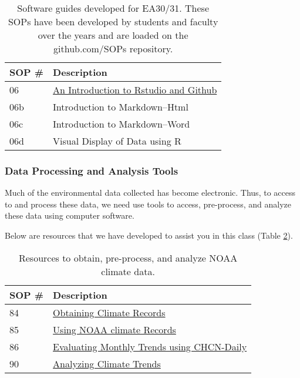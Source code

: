 \documentclass{article}\usepackage[]{graphicx}\usepackage[]{color}
\begin{document}
\begin{table}[h]
\caption{Software guides developed for EA30/31. These SOPs have been developed by students and faculty over the years and are loaded on the github.com/SOPs repository.}\label{tab:softwareguides}
\centering
\begin{tabular}{ll}\hline
SOP \#    & Description                                 \\\hline\hline
06        & \href{https://github.com/marclos/Climate_Change_Narratives/blob/master/Analysis_SOPs/SOP06_Rstudio_Server_Github.pdf}{An Introduction to Rstudio and Github} \\
06b       & Introduction to Markdown--Html  \\
06c       & Introduction to Markdown--Word  \\
06d       & Visual Display of Data using R  \\
\hline
\end{tabular}
\end{table}

\subsubsection{Data Processing and Analysis Tools}

Much of the environmental data collected has become electronic. Thus, to access to and process these data, we need use tools to access, pre-process, and analyze these data using computer software. 

Below are resources that we have developed to assist you in this class (Table \ref{tab:tools}).

\begin{table}[h]

\caption{Resources to obtain, pre-process, and analyze NOAA climate data.}\label{tab:tools}
\centering
\begin{tabular}{ll}\hline
SOP \#    & Description                                 \\\hline\hline
84        & \href{https://github.com/marclos/Climate_Change_Narratives/raw/master/Analysis_SOPs/SOP84_Obtaining_Climate_Records.pdf}{Obtaining Climate Records}\\
85        & \href{https://github.com/marclos/Climate_Change_Narratives/raw/master/Analysis_SOPs/SOP85_Using_NOAA_Climate_Records.pdf}{Using NOAA climate Records}\\
86        & \href{https://github.com/marclos/Climate_Change_Narratives/raw/master/Analysis_SOPs/SOP86_Evaluating_Monthly_Trends_CHCNDaily.pdf}{Evaluating Monthly Trends using CHCN-Daily}\\
90        & \href{https://github.com/marclos/Climate_Change_Narratives/raw/master/Analysis_SOPs/SOP90_Analyzing_Trends.pdf}{Analyzing Climate Trends} \\ \hline
\end{tabular}
\end{table}
\end{document}

